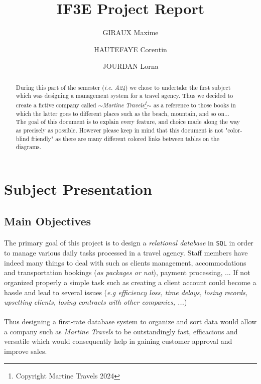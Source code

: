 \documentclass[11pt,a4paper,titlepage]{article}
\title{IF3E Project Report}
\author{GIRAUX Maxime \and HAUTEFAYE Corentin \and JOURDAN Lorna}
\begin{document}
\maketitle

\renewcommand{\abstractname}{Introduction}
\begin{abstract}
	During this part of the semester (\textit{i.e. A24}) we chose to undertake the first subject which was designing a management system for a travel agency. Thus we decided to create a fictive company called \textit{$\sim$Martine Travels\footnote{Copyright \textcopyright Martine Travels 2024}$\sim$} as a reference to those books in which the latter goes to different places such as the beach, mountain, and so on... 
	\\The goal of this document is to explain every feature, and choice made along the way as precisely as possible. However please keep in mind that this document is not "color-blind friendly" as there are many different colored links between tables on the diagrams.
\end{abstract}

\tableofcontents
\newpage

\section{Subject Presentation}
\subsection{Main Objectives}
\paragraph{}
The primary goal of this project is to design a \textit{relational database} in  \verb|SQL| in order to manage various daily tasks processed in a travel agency. Staff members have indeed many things to deal with such as clients management, accommodations and transportation bookings (\textit{as packages or not}), payment processing, ... If not organized properly a simple task such as creating a client account could become a hassle and lead to several issues (\textit{e.g efficiency loss, time delays, losing records, upsetting clients, losing contracts with other companies, ...}) 
\paragraph{}
Thus designing a first-rate database system to organize and sort data would allow a company such as \textit{Martine Travels} to be outstandingly fast, efficacious and versatile which would consequently help in gaining customer approval and improve sales.
\end{document}
